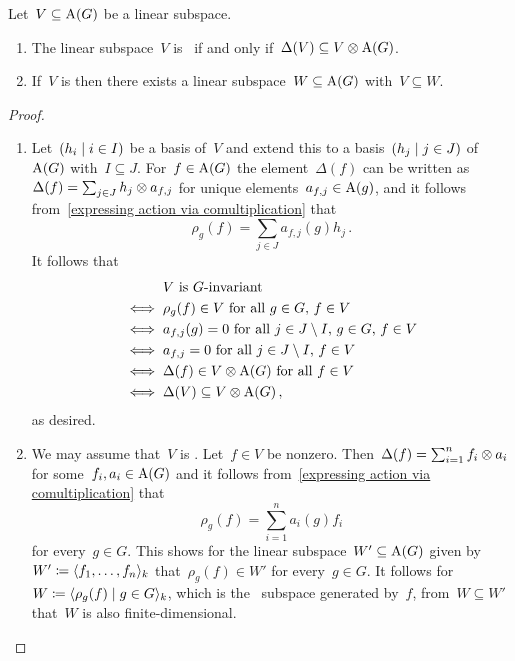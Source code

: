 \begin{lemma}
\label{invariant subspaces of coordinate ring}
  Let~$V \subseteq \operatorname{A}(G)$ be a linear subspace.
  \begin{enumerate}
    \item
      The linear subspace~$V$ is~ if and only if~$\Delta(V) \subseteq V \mathbin{\otimes} \operatorname{A}(G)$.
    \item
      If~$V$ is  then there exists a  linear subspace~$W \subseteq \operatorname{A}(G)$ with~$V \subseteq W$.
  \end{enumerate}
\end{lemma}


\begin{proof}
  \leavevmode
  \begin{enumerate}
    \item
      Let~$(h_i \suchthat i \in I)$ be a basis of~$V$ and extend this to a basis~$(h_j \suchthat j \in J)$ of~$\operatorname{A}(G)$ with~$I \subseteq J$.
      For~$f \in \operatorname{A}(G)$ the element~$\Delta(f)$ can be written as~$\Delta(f) = \sum_{j \in J} h_j \mathbin{\otimes} a_{f,j}$ for unique elements~$a_{f,j} \in \operatorname{A}(g)$, and it follows from~\eqref{expressing action via comultiplication} that
      \[
          \rho_g(f)
        = \sum_{j \in J} a_{f,j}(g) h_j \,.
      \]
      It follows that
      \begin{align*}
            {}& \text{$V$ is~\dash{$G$}{invariant}} \\
        \iff{}& \text{$\rho_g(f) \in V$ for all~$g \in G$,~$f \in V$} \\
        \iff{}& \text{$a_{f,j}(g) = 0$ for all~$j \in J \setminus I$,~$g \in G$,~$f \in V$} \\
        \iff{}& \text{$a_{f,j} = 0$ for all~$j \in J \setminus I$,~$f \in V$} \\
        \iff{}& \text{$\Delta(f) \in V \tensor \coord(G)$ for all~$f \in V$}  \\
        \iff{}& \Delta(V) \subseteq V \tensor \coord(G) \,,
      \end{align*}
      as desired.
    \item
      We may assume that~$V$ is .
      Let~$f \in V$ be nonzero.
      Then~$\Delta(f) = \sum_{i=1}^n f_i \mathbin{\otimes} a_i$ for some~$f_i, a_i \in \operatorname{A}(G)$ and it follows from~\eqref{expressing action via comultiplication} that
      \[
          \rho_g(f)
        = \sum_{i=1}^n a_i(g) f_i
      \]
      for every~$g \in G$.
      This shows for the  linear subspace~$W' \subseteq \operatorname{A}(G)$ given by~$W' \coloneqq \langle f_1, \dotsc, f_n\rangle_k$ that~$\rho_g(f) \in W'$ for every~$g \in G$.
      It follows for~$W \defined \gen{ \rho_g(f) \suchthat g \in G }_k$, which is the~ subspace generated by~$f$, from~$W \subseteq W'$ that~$W$ is also finite-dimensional.
    \qedhere
  \end{enumerate}
\end{proof}


